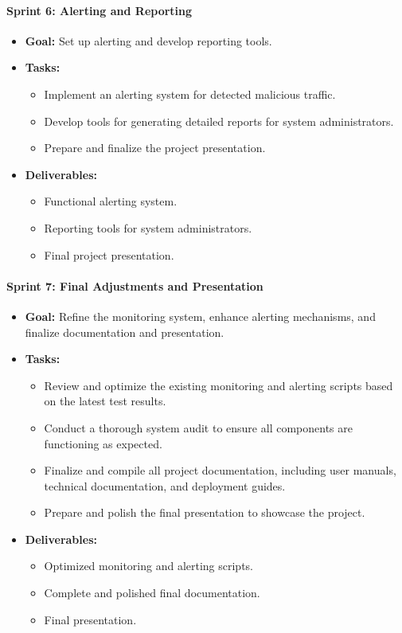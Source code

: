 \documentclass{article}
\begin{document}
    \paragraph{Sprint 6: Alerting and Reporting}
    \begin{itemize}
        \item \textbf{Goal:} Set up alerting and develop reporting tools.
        \item \textbf{Tasks:}
        \begin{itemize}
            \item Implement an alerting system for detected malicious traffic.
            \item Develop tools for generating detailed reports for system administrators.
            \item Prepare and finalize the project presentation.
        \end{itemize}
        \item \textbf{Deliverables:}
        \begin{itemize}
            \item Functional alerting system.
            \item Reporting tools for system administrators.
            \item Final project presentation.
        \end{itemize}
    \end{itemize}

    \paragraph{Sprint 7: Final Adjustments and Presentation}
    \begin{itemize}
        \item \textbf{Goal:} Refine the monitoring system, enhance alerting mechanisms, and finalize documentation and presentation.
        \item \textbf{Tasks:}
        \begin{itemize}
            \item Review and optimize the existing monitoring and alerting scripts based on the latest test results.
            \item Conduct a thorough system audit to ensure all components are functioning as expected.
            \item Finalize and compile all project documentation, including user manuals, technical documentation, and deployment guides.
            \item Prepare and polish the final presentation to showcase the project.
        \end{itemize}
        \item \textbf{Deliverables:}
        \begin{itemize}
            \item Optimized monitoring and alerting scripts.
            \item Complete and polished final documentation.
            \item Final presentation.
        \end{itemize}
    \end{itemize}
\end{document}
